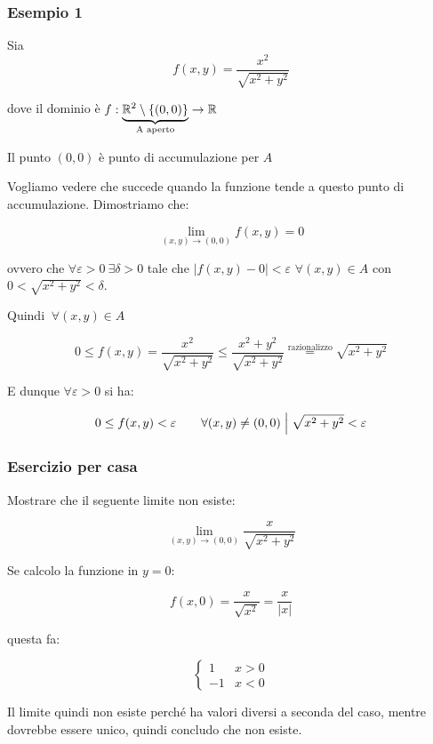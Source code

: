 \subsubsection*{Esempio 1}

Sia
\[
    f(x,y) = \frac{x^{2}}{\sqrt{x^{2}+y^{2}}}
\]

dove il dominio è \(f: \underbrace{\R^{2}\setminus \{(0,0)\}}_\text{A aperto}\rightarrow \R \)

Il punto \((0,0)\) è punto di accumulazione per \(A\)

Vogliamo vedere che succede quando la funzione tende a questo punto di accumulazione. Dimostriamo che:

\[
    \lim_{ (x,y) \to (0,0) } f(x,y) = 0
\]

ovvero che \(\forall \varepsilon >0 ~\exists \delta >0\) tale che \(|f(x,y) -0| < \varepsilon \) \(\forall (x,y) \in A\) con \(0< \sqrt{x^{2}+y^{2}}<\delta \).

Quindi \(~\forall (x,y) \in A\)

\[
    0 \le f(x,y) = \frac{x^{2}}{\sqrt{x^{2}+y^{2}}} \le \frac{x^{2}+y^{2}}{\sqrt{x^{2}+y^{2}}} \overset{\text{razionalizzo}}{=} \sqrt{x^{2}+y^{2}}
\]

E dunque \(\forall \varepsilon > 0\) si ha:

\[
    0 \le f(x,y) < \varepsilon \qquad \forall (x,y) \neq (0,0) \giventhat[\Big] \sqrt{x^{2}+y^{2}} < \varepsilon
\]

\filbreak{}
\subsubsection*{Esercizio per casa}

Mostrare che il seguente limite non esiste:

\[
    \lim_{ (x,y) \to (0,0) } \frac{x}{\sqrt{x^{2}+y^{2}}}
\]

Se calcolo la funzione in \(y=0\):

\[
    f(x,0) = \frac{x}{\sqrt{x^{2}}}= \frac{x}{|x|}
\]

questa fa:

\begin{equation*}
    \begin{cases}
        1  & x > 0 \\
        -1 & x < 0
    \end{cases}
\end{equation*}

Il limite quindi non esiste perché ha valori diversi a seconda del caso, mentre dovrebbe essere unico, quindi concludo che non esiste.

